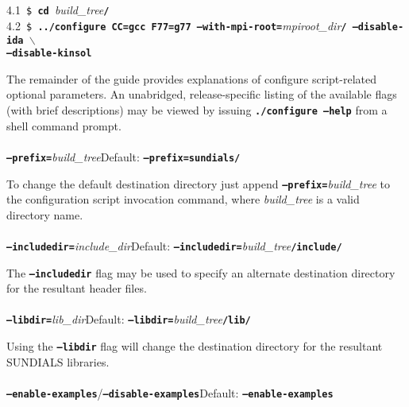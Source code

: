 \\
\\
\small 4.1\normalsize\texttt{ \$\textbf{ cd }}\textit{build\_tree}\texttt{\textbf{/}} \\
\small 4.2\normalsize\texttt{ \$\textbf{ ../configure CC=gcc F77=g77 --with-mpi-root=}}\textit{mpiroot\_dir}\texttt{\textbf{/ --disable-ida  $\backslash$}} \\
\hspace*{3.5ex}\texttt{\textbf{--disable-kinsol}}
\\ \setlength{\parindent}{0.5cm}

The remainder of the guide provides explanations of configure script-related optional parameters.  An unabridged, release-specific listing of the available flags (with brief descriptions) may be viewed by issuing \texttt{\textbf{./configure --help}} from a shell command prompt.
\\
\\
\texttt{\textbf{--prefix=}}\textit{build\_tree}\hspace{0.5in}Default: \texttt{\textbf{--prefix=sundials/}}\vspace{0.05in}

To change the default destination directory just append \texttt{\textbf{--prefix=}}\textit{build\_tree} to the configuration script invocation command, where \textit{build\_tree} is a valid directory name.
\\
\\
\texttt{\textbf{--includedir=}}\textit{include\_dir}\hspace{0.5in}Default: \texttt{\textbf{--includedir=}}\textit{build\_tree}\texttt{\textbf{/include/}}\vspace{0.05in}

The \texttt{\textbf{--includedir}} flag may be used to specify an alternate destination directory for the resultant header files.
\\
\\
\texttt{\textbf{--libdir=}}\textit{lib\_dir}\hspace{0.5in}Default: \texttt{\textbf{--libdir=}}\textit{build\_tree}\texttt{\textbf{/lib/}}\vspace{0.05in}

Using the \texttt{\textbf{--libdir}} flag will change the destination directory for the resultant \small SUNDIALS \normalsize libraries.
\\
\\
\texttt{\textbf{--enable-examples}}/\texttt{\textbf{--disable-examples}}\hspace{0.5in}Default: \texttt{\textbf{--enable-examples}}\vspace{0.05in}

